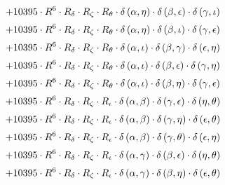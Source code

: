 \begin{subequations}
\begin{gather}
 \\[0.2em] \notag 		 + 10395 \cdot R^{6} \cdot R_{\delta{}} \cdot R_{\zeta{}} \cdot R_{\theta{}} \cdot \delta{}\left(\alpha{}, \eta{}\right) \cdot \delta{}\left(\beta{}, \epsilon{}\right) \cdot \delta{}\left(\gamma{}, \iota{}\right) 
 \\[0.2em] \notag 		 + 10395 \cdot R^{6} \cdot R_{\delta{}} \cdot R_{\zeta{}} \cdot R_{\theta{}} \cdot \delta{}\left(\alpha{}, \eta{}\right) \cdot \delta{}\left(\beta{}, \iota{}\right) \cdot \delta{}\left(\gamma{}, \epsilon{}\right) 
 \\[0.2em] \notag 		 + 10395 \cdot R^{6} \cdot R_{\delta{}} \cdot R_{\zeta{}} \cdot R_{\theta{}} \cdot \delta{}\left(\alpha{}, \iota{}\right) \cdot \delta{}\left(\beta{}, \gamma{}\right) \cdot \delta{}\left(\epsilon{}, \eta{}\right) 
 \\[0.2em] \notag 		 + 10395 \cdot R^{6} \cdot R_{\delta{}} \cdot R_{\zeta{}} \cdot R_{\theta{}} \cdot \delta{}\left(\alpha{}, \iota{}\right) \cdot \delta{}\left(\beta{}, \epsilon{}\right) \cdot \delta{}\left(\gamma{}, \eta{}\right) 
 \\[0.2em] \notag 		 + 10395 \cdot R^{6} \cdot R_{\delta{}} \cdot R_{\zeta{}} \cdot R_{\theta{}} \cdot \delta{}\left(\alpha{}, \iota{}\right) \cdot \delta{}\left(\beta{}, \eta{}\right) \cdot \delta{}\left(\gamma{}, \epsilon{}\right) 
 \\[0.2em] \notag 		 + 10395 \cdot R^{6} \cdot R_{\delta{}} \cdot R_{\zeta{}} \cdot R_{\iota{}} \cdot \delta{}\left(\alpha{}, \beta{}\right) \cdot \delta{}\left(\gamma{}, \epsilon{}\right) \cdot \delta{}\left(\eta{}, \theta{}\right) 
 \\[0.2em] \notag 		 + 10395 \cdot R^{6} \cdot R_{\delta{}} \cdot R_{\zeta{}} \cdot R_{\iota{}} \cdot \delta{}\left(\alpha{}, \beta{}\right) \cdot \delta{}\left(\gamma{}, \eta{}\right) \cdot \delta{}\left(\epsilon{}, \theta{}\right) 
 \\[0.2em] \notag 		 + 10395 \cdot R^{6} \cdot R_{\delta{}} \cdot R_{\zeta{}} \cdot R_{\iota{}} \cdot \delta{}\left(\alpha{}, \beta{}\right) \cdot \delta{}\left(\gamma{}, \theta{}\right) \cdot \delta{}\left(\epsilon{}, \eta{}\right) 
 \\[0.2em] \notag 		 + 10395 \cdot R^{6} \cdot R_{\delta{}} \cdot R_{\zeta{}} \cdot R_{\iota{}} \cdot \delta{}\left(\alpha{}, \gamma{}\right) \cdot \delta{}\left(\beta{}, \epsilon{}\right) \cdot \delta{}\left(\eta{}, \theta{}\right) 
 \\[0.2em] \notag 		 + 10395 \cdot R^{6} \cdot R_{\delta{}} \cdot R_{\zeta{}} \cdot R_{\iota{}} \cdot \delta{}\left(\alpha{}, \gamma{}\right) \cdot \delta{}\left(\beta{}, \eta{}\right) \cdot \delta{}\left(\epsilon{}, \theta{}\right) 

\end{gather}
\end{subequations}
